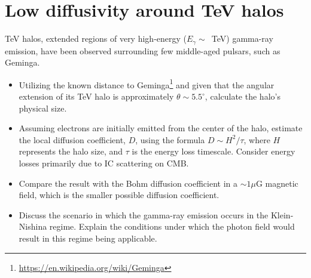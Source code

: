 \section{Low diffusivity around TeV halos}

TeV halos, extended regions of very high-energy ($E_\gamma \sim$~TeV) gamma-ray emission, have been observed surrounding few middle-aged pulsars, such as Geminga. %

\begin{itemize}
\item Utilizing the known distance to Geminga\footnote{\url{https://en.wikipedia.org/wiki/Geminga}} and given that the angular extension of its TeV halo is approximately \(\theta \sim 5.5^\circ\), calculate the halo's physical size.
\item Assuming electrons are initially emitted from the center of the halo, estimate the local diffusion coefficient, $D$, using the formula $D \sim H^2/\tau$, where $H$ represents the halo size, and $\tau$ is the energy loss timescale. Consider energy losses primarily due to IC scattering on CMB.
\item Compare the result with the Bohm diffusion coefficient in a $\sim 1 \mu$G magnetic field, which is the smaller possible diffusion coefficient.
\item Discuss the scenario in which the gamma-ray emission occurs in the Klein-Nishina regime. Explain the conditions under which the photon field would result in this regime being applicable.
\end{itemize}
